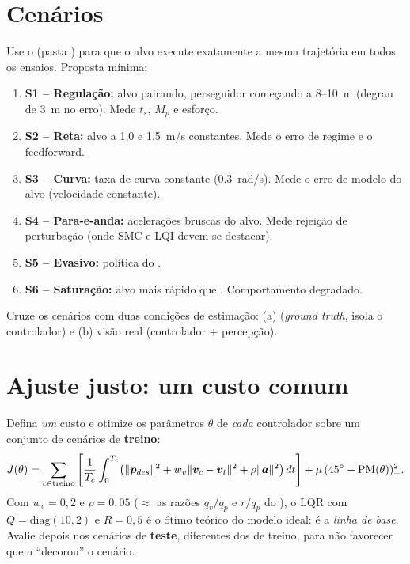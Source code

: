 \section{Cenários}
Use o  (pasta ) para que o alvo execute
exatamente a mesma trajetória em todos os ensaios. Proposta mínima:
\begin{enumerate}
  \item \textbf{S1 -- Regulação:} alvo pairando, perseguidor começando a 8--\SI{10}{m}
        (degrau de \SI{3}{m} no erro). Mede $t_s$, $M_p$ e esforço.
  \item \textbf{S2 -- Reta:} alvo a 1,0 e \SI{1,5}{m/s} constantes. Mede o erro de
        regime e o feedforward.
  \item \textbf{S3 -- Curva:} taxa de curva constante (\SI{0,3}{rad/s}). Mede o erro de
        modelo do alvo (velocidade constante).
  \item \textbf{S4 -- Para-e-anda:} acelerações bruscas do alvo. Mede rejeição de
        perturbação (onde SMC e LQI devem se destacar).
  \item \textbf{S5 -- Evasivo:} política  do .
  \item \textbf{S6 -- Saturação:} alvo mais rápido que . Comportamento
        degradado.
\end{enumerate}
Cruze os cenários com duas condições de estimação: (a) 
(\emph{ground truth}, isola o controlador) e (b) visão real (controlador + percepção).

\section{Ajuste justo: um custo comum}
Defina \emph{um} custo e otimize os parâmetros $\theta$ de \emph{cada} controlador sobre
um conjunto de cenários de \textbf{treino}:
\begin{equation}
  J(\theta)=\sum_{c\in\text{treino}}
  \left[\frac{1}{T_c}\int_0^{T_c}\!\left(\lVert\bm{p}_{des}\rVert^2
  + w_v\lVert\bm{v}_c-\bm{v}_t\rVert^2 + \rho\lVert\bm{a}\rVert^2\right)dt\right]
  + \mu\,(\ang{45}-\text{PM}(\theta))_+^2 .
  \label{eq:jcomum}
\end{equation}
Com $w_v=0{,}2$ e $\rho=0{,}05$ ($\approx$ as razões $q_v/q_p$ e $r/q_p$ do ),
o LQR com $Q=\mathrm{diag}(10,2)$ e $R=0{,}5$ é o ótimo teórico do modelo ideal: é a
\emph{linha de base}. Avalie depois nos cenários de \textbf{teste}, diferentes dos de
treino, para não favorecer quem ``decorou'' o cenário.

